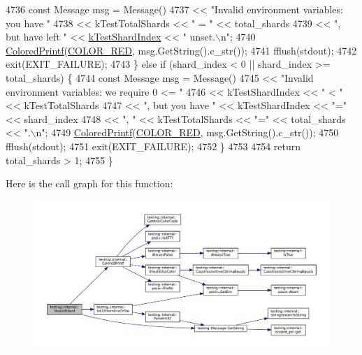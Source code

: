 \begin{DoxyCode}
4736     \textcolor{keyword}{const} Message msg = Message()
4737       << \textcolor{stringliteral}{"Invalid environment variables: you have "}
4738       << kTestTotalShards << \textcolor{stringliteral}{" = "} << total\_shards
4739       << \textcolor{stringliteral}{", but have left "} << \hyperlink{namespacetesting_a5f76dfdb8cb2664da54e320ecaba3643}{kTestShardIndex} << \textcolor{stringliteral}{" unset.\(\backslash\)n"};
4740     \hyperlink{namespacetesting_1_1internal_adef3055706176001364e54eb73a87e31}{ColoredPrintf}(\hyperlink{namespacetesting_1_1internal_a648c1bc94c2ef9e868ff3f9dff0f9c4ea9ebb3ddab9391781f6ee5021e1e443c3}{COLOR\_RED}, msg.GetString().c\_str());
4741     fflush(stdout);
4742     exit(EXIT\_FAILURE);
4743   \} \textcolor{keywordflow}{else} \textcolor{keywordflow}{if} (shard\_index < 0 || shard\_index >= total\_shards) \{
4744     \textcolor{keyword}{const} Message msg = Message()
4745       << \textcolor{stringliteral}{"Invalid environment variables: we require 0 <= "}
4746       << kTestShardIndex << \textcolor{stringliteral}{" < "} << kTestTotalShards
4747       << \textcolor{stringliteral}{", but you have "} << kTestShardIndex << \textcolor{stringliteral}{"="} << shard\_index
4748       << \textcolor{stringliteral}{", "} << kTestTotalShards << \textcolor{stringliteral}{"="} << total\_shards << \textcolor{stringliteral}{".\(\backslash\)n"};
4749     \hyperlink{namespacetesting_1_1internal_adef3055706176001364e54eb73a87e31}{ColoredPrintf}(\hyperlink{namespacetesting_1_1internal_a648c1bc94c2ef9e868ff3f9dff0f9c4ea9ebb3ddab9391781f6ee5021e1e443c3}{COLOR\_RED}, msg.GetString().c\_str());
4750     fflush(stdout);
4751     exit(EXIT\_FAILURE);
4752   \}
4753 
4754   \textcolor{keywordflow}{return} total\_shards > 1;
4755 \}
\end{DoxyCode}
Here is the call graph for this function\+:
\nopagebreak
\begin{figure}[H]
\begin{center}
\leavevmode
\includegraphics[width=350pt]{namespacetesting_1_1internal_a0fe41657b1d1ab7ec4e37ec07403ee6c_cgraph}
\end{center}
\end{figure}
